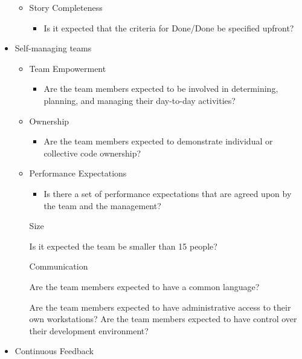 \begin{appendices}
\begin{itemize}
\begin{itemize}
\begin{itemize}
				\end{itemize}
			\item Story Completeness
				\begin{itemize}
					\item Is it expected that the criteria for Done/Done be specified upfront?
				\end{itemize}
		\end{itemize}
	\item Self-managing teams
		\begin{itemize}
			\item Team Empowerment
				\begin{itemize}
					\item Are the team members expected to be involved in determining, planning, and managing their day-to-day activities?
				\end{itemize}
			\item Ownership
				\begin{itemize}
					\item Are the team members expected to demonstrate individual or collective code ownership? 
				\end{itemize}
			\item Performance Expectations
				\begin{itemize}
					\item Is there a set of performance expectations that are agreed upon by the team and the management?
				\end{itemize}
			\addition Size
				\begin{itemize}
					\addition Is it expected the team be smaller than 15 people?
				\end{itemize}
			\addition Communication
				\begin{itemize}
					\addition Are the team members expected to have a common language?
				\end{itemize}
			\addition{System Administration}
				\begin{itemize}
					\addition Are the team members expected to have administrative access to their own workstations?
					\addition Are the team members expected to have control over their development environment?	
				\end{itemize}
		\end{itemize}
	\item Continuous Feedback
		\begin{itemize}

\end{itemize}
\end{itemize}
\end{appendices}
